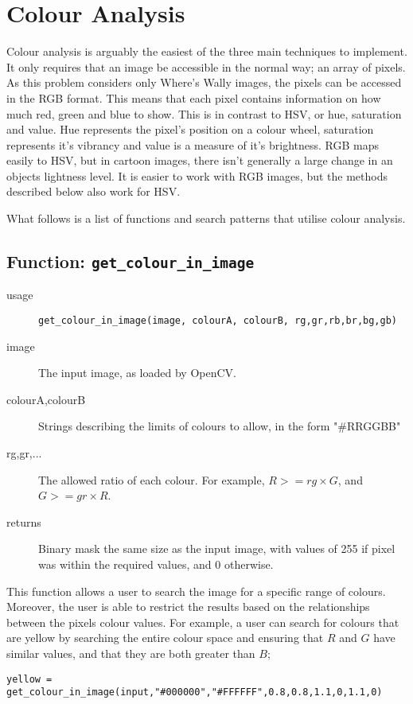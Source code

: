 \documentclass[../main.tex]{subfiles}
\begin{document}
  \section{Colour Analysis}
    Colour analysis is arguably the easiest of the three main techniques to implement.
    It only requires that an image be accessible in the normal way; an array of pixels.
    As this problem considers only Where's Wally images, the pixels can be accessed in the RGB format.
    This means that each pixel contains information on how much red, green and blue to show.
    This is in contrast to HSV, or hue, saturation and value.
    Hue represents the pixel's position on a colour wheel, saturation represents it's vibrancy and value is a measure of it's brightness.
    RGB maps easily to HSV, but in cartoon images, there isn't generally a large change in an objects lightness level.
    It is easier to work with RGB images, but the methods described below also work for HSV.

    What follows is a list of functions and search patterns that utilise colour analysis.

  \subsection{Function: \texttt{get\_colour\_in\_image}}
    \begin{description}
      \item[usage] \texttt{get\_colour\_in\_image(image, colourA, colourB, rg,gr,rb,br,bg,gb)}
      \item[image] The input image, as loaded by OpenCV.
      \item[colourA,colourB] Strings describing the limits of colours to allow, in the form "\#RRGGBB"
      \item[rg,gr,...] The allowed ratio of each colour. For example, $R >= rg\times G$, and $G >=gr\times R$.
      \item[returns] Binary mask the same size as the input image, with values of 255 if pixel was within the required values, and 0 otherwise.
    \end{description}

    This function allows a user to search the image for a specific range of colours.
    Moreover, the user is able to restrict the results based on the relationships between the pixels colour values.
    For example, a user can search for colours that are yellow by searching the entire colour space and ensuring that $R$ and $G$ have similar values, and that they are both greater than $B$;
    \begin{center}
      \texttt{yellow = get\_colour\_in\_image(input,"\#000000","\#FFFFFF",0.8,0.8,1.1,0,1.1,0)}
    \end{center}
\end{document}
